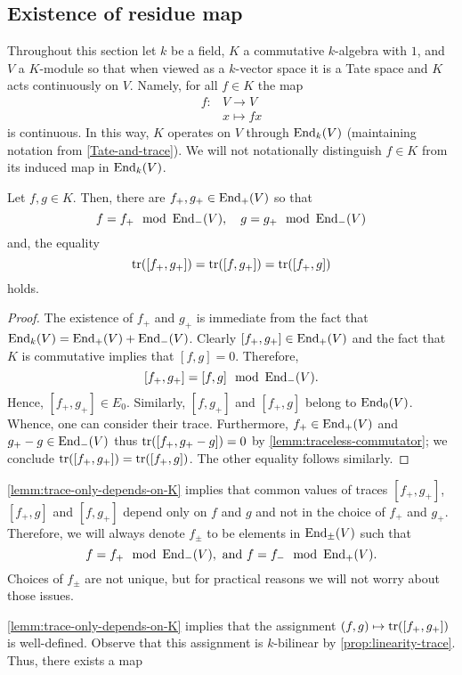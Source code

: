 \subsection{Existence of residue map}
Throughout this section let $k$ be a field, $K$ a commutative $k$-algebra with $1$, and $V$ a $K$-module so that when viewed as a $k$-vector space it is a Tate space and $K$ acts continuously on $V$. Namely, for all $f \in K$ the map 
\begin{align*}
	f\colon &V \to V \\
	&x \mapsto fx 
\end{align*}
is continuous. In this way, $K$ operates on $V$ through $\operatorname{End}_{k}(V)$ (maintaining notation from \cref{Tate-and-trace}). We will not notationally distinguish $f\in K$ from its induced map in $\operatorname{End}_{k}(V)$.
\begin{lemma}\label{lemm:trace-only-depends-on-K}
	Let $f,g \in K$. Then, there are $f_{+}, g_{+} \in \operatorname{End}_{+}(V)$ so that 
	\[
	f = f_{+} \mod {\operatorname{End}}_{-}(V) ,\quad g = g_{+} \mod {\operatorname{End}}_{-}(V)
	\]
	and, the equality
	\[
		\operatorname{tr}([f_{+},g_{+}]) = \operatorname{tr}([f, g_{+}]) = \operatorname{tr}([f_{+}, g])
	\]
	holds.
\end{lemma}
\begin{proof}
The existence of $f_{+}$ and $g_{+}$ is immediate from the fact that $\operatorname{End}_{k}(V) = \operatorname{End}_{+}(V) + \operatorname{End}_{-}(V)$.  Clearly $[f_{+},g_{+}]\in \operatorname{End}_{+}(V)$ and the fact that $K$ is commutative implies that $[f,g] = 0$. Therefore,
\[
	[f_{+},g_{+}] = [f,g] \mod {\operatorname{End}}_{-}(V).
\]
Hence, $[f_{+},g_{+}]\in E_0$. Similarly, $[f,g_{+}]$ and $[f_{+}, g]$ belong to $\operatorname{End}_{0}(V)$. Whence, one can consider their trace. Furthermore, $f_{+} \in \operatorname{End}_{+}(V)$ and $g_{+} - g \in \operatorname{End}_{-}(V)$ thus $\operatorname{tr}([f_{+}, g_{+} - g]) = 0$ by \cref{lemm:traceless-commutator}; we conclude $\operatorname{tr}([f_{+}, g_{+}]) = \operatorname{tr}([f_{+}, g])$. The other equality follows similarly.
\end{proof}
\begin{notation}\label{not:plus-and-minus}
	\cref{lemm:trace-only-depends-on-K} implies that common values of traces $[f_{+},g_{+}]$, $[f_{+}, g]$ and $[f, g_{+}]$ depend only on $f$ and $g$ and not in the choice of $f_{+}$ and $g_{+}$. Therefore, we will always denote $f_{\pm}$ to be elements in $\operatorname{End}_{\pm}(V)$ such that
	\[
		f = f_{+} \mod {\operatorname{End}}_{-}(V) ,\text{ and } f = f_{-} \mod {\operatorname{End}}_{+}(V).
	\] 
	Choices of $f_{\pm}$ are not unique, but for practical reasons we will not worry about those issues. 
\end{notation}
\cref{lemm:trace-only-depends-on-K} implies that the assignment $(f,g) \mapsto \operatorname{tr}([f_{+}, g_{+}])$  is well-defined. Observe that this assignment is $k$-bilinear by \cref{prop:linearity-trace}. Thus, there exists a map
